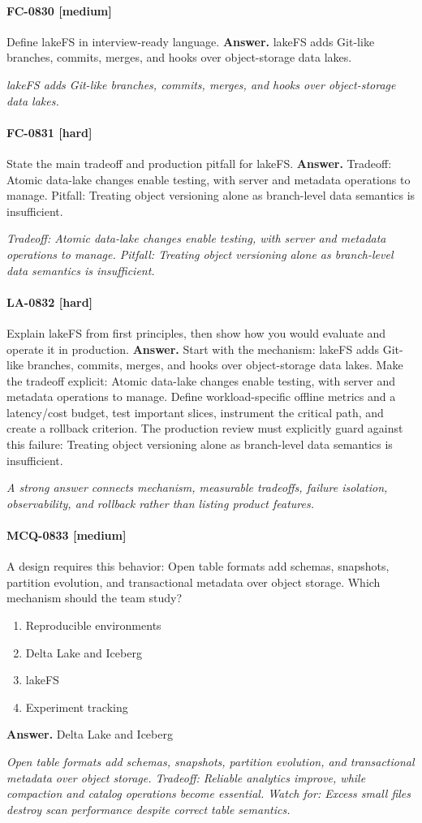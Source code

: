 \paragraph{FC-0830 [medium]} Define lakeFS in interview-ready language.
\noindent\textbf{Answer.} lakeFS adds Git-like branches, commits, merges, and hooks over object-storage data lakes.
\par\textit{lakeFS adds Git-like branches, commits, merges, and hooks over object-storage data lakes.}
\paragraph{FC-0831 [hard]} State the main tradeoff and production pitfall for lakeFS.
\noindent\textbf{Answer.} Tradeoff: Atomic data-lake changes enable testing, with server and metadata operations to manage. Pitfall: Treating object versioning alone as branch-level data semantics is insufficient.
\par\textit{Tradeoff: Atomic data-lake changes enable testing, with server and metadata operations to manage. Pitfall: Treating object versioning alone as branch-level data semantics is insufficient.}
\paragraph{LA-0832 [hard]} Explain lakeFS from first principles, then show how you would evaluate and operate it in production.
\noindent\textbf{Answer.} Start with the mechanism: lakeFS adds Git-like branches, commits, merges, and hooks over object-storage data lakes. Make the tradeoff explicit: Atomic data-lake changes enable testing, with server and metadata operations to manage. Define workload-specific offline metrics and a latency/cost budget, test important slices, instrument the critical path, and create a rollback criterion. The production review must explicitly guard against this failure: Treating object versioning alone as branch-level data semantics is insufficient.
\par\textit{A strong answer connects mechanism, measurable tradeoffs, failure isolation, observability, and rollback rather than listing product features.}
\paragraph{MCQ-0833 [medium]} A design requires this behavior: Open table formats add schemas, snapshots, partition evolution, and transactional metadata over object storage. Which mechanism should the team study?
\begin{enumerate}[label=\Alph*.]
\item Reproducible environments
\item Delta Lake and Iceberg
\item lakeFS
\item Experiment tracking
\end{enumerate}
\noindent\textbf{Answer.} Delta Lake and Iceberg
\par\textit{Open table formats add schemas, snapshots, partition evolution, and transactional metadata over object storage. Tradeoff: Reliable analytics improve, while compaction and catalog operations become essential. Watch for: Excess small files destroy scan performance despite correct table semantics.}
